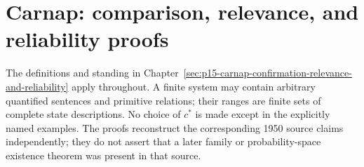 \section{Carnap: comparison, relevance, and reliability proofs}
\label{sec:annex-p15-carnap-confirmation-relevance-and-reliability}

The definitions and standing in
Chapter~\ref{sec:p15-carnap-confirmation-relevance-and-reliability}
apply throughout. A finite system may contain arbitrary quantified
sentences and primitive relations; their ranges are finite sets of
complete state descriptions. No choice of \(c^*\) is made except in
the explicitly named examples. The proofs reconstruct the corresponding
1950 source claims independently; they do not assert that a later
family or probability-space existence theorem was present in that source.

